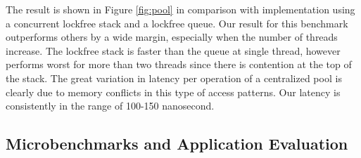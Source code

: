 The result is shown in Figure \ref{fig:pool} in comparison with implementation
using a concurrent lockfree stack and a lockfree queue. Our result for this
benchmark outperforms others by a wide margin, especially when the number of
threads increase. The lockfree stack is faster than the queue at single thread,
however performs worst for more than two threads since there is contention at
the top of the stack. The great variation in latency per operation of a
centralized pool is clearly due to memory conflicts in this type of access
patterns. Our latency is consistently in the range of 100-150 nanosecond.


\subsection{Microbenchmarks and Application Evaluation}
